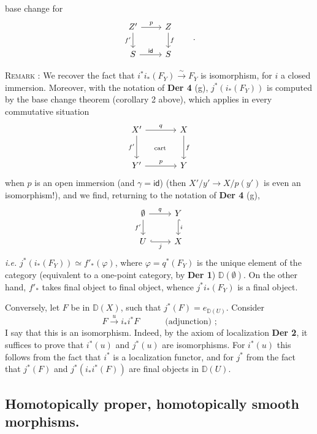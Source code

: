 \documentclass[11pt]{article}
\newcommand{\printedpage}[1]{\marginpar{\footnotesize p.~#1}}
\newcommand{\msp}[1]{\marginpar{\footnotesize [#1]}}
\newcommand{\id}{\mathsf{id}}
\newcommand{\DD}{\mathbb{D}}
\begin{document}
\printedpage{29}

\noindent\msp{page 51}
base change for
\[
\begin{tikzcd}
Z' \arrow[r, "p"] \arrow[d, "f'"'] & Z \arrow[d, "f"] \\
S \arrow[r, "\id"] & S
\end{tikzcd}
\qquad .
\]

\noindent\textsc{Remark} : We recover the fact that $i^*i_*(F_Y) \overset{\sim}{\to} F_Y$ is isomorphism, for $i$ a closed immersion. Moreover, with the notation of \textbf{Der 4} (g), $j^*(i_*(F_Y))$ is computed by the base change theorem (corollary 2 above), which applies in every commutative situation
\[
\begin{tikzcd}[row sep=large, column sep=large]
X' \arrow[r, "q"] \arrow[d, "f'"'] \arrow[dr, phantom, "\text{\scriptsize cart}"] & X \arrow[d, "f"] \\
Y' \arrow[r, "p"] & Y
\end{tikzcd}
\]
when $p$ is an open immersion (and $\gamma = \id$) (then $X'/y' \to X/p(y')$ is even an isomorphism!), and we find, returning to the notation of \textbf{Der 4} (g),
\[
\begin{tikzcd}
\emptyset \arrow[r, "q"] \arrow[d, "f'"'] & Y \arrow[d, hook, "i"] \\
U \arrow[r, hook, "j"'] & X
\end{tikzcd}
\]
\textit{i.e.} $j^*(i_*(F_Y)) \simeq f'_*(\varphi)$, where $\varphi = q^*(F_Y)$ is the unique element of the category (equivalent to a one-point category, by \textbf{Der 1}) $\DD(\emptyset)$. On the other hand, $f'_*$ takes final object to final object, whence $j^*i_*(F_Y)$ is a final object.

Conversely, let $F$ be in $\DD(X)$, such that $j^*(F) = e_{\DD(U)}$. Consider
\[
F \xrightarrow{u} i_*i^*F \qquad\quad \text{(adjunction) ;}
\]
I say that this is an isomorphism. Indeed, by the axiom \msp{page 52} of localization \textbf{Der 2}, it suffices to prove that $i^*(u)$ and $j^*(u)$ are isomorphisms. For $i^*(u)$ this follows from the fact that $i^*$ is a localization functor, and for $j^*$ from the fact that $j^*(F)$ and $j^*(i_*i^*(F))$ are final objects in $\DD(U)$.

\printedpage{30}

\noindent\msp{page 53}

\subsection*{Homotopically proper, homotopically smooth morphisms.}
\end{document}
